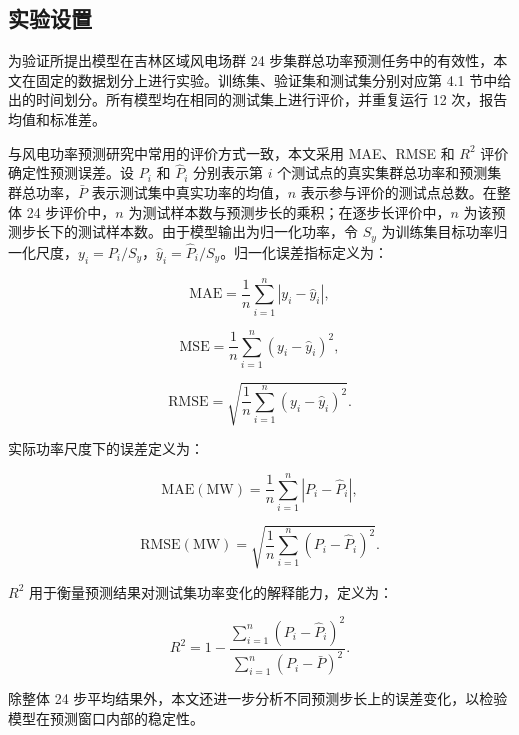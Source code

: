 \subsection{实验设置}

为验证所提出模型在吉林区域风电场群 24 步集群总功率预测任务中的有效性，本文在固定的数据划分上进行实验。训练集、验证集和测试集分别对应第 4.1 节中给出的时间划分。所有模型均在相同的测试集上进行评价，并重复运行 12 次，报告均值和标准差。

与风电功率预测研究中常用的评价方式一致，本文采用 MAE、RMSE 和 \(R^2\) 评价确定性预测误差。设 \(P_i\) 和 \(\hat{P}_i\) 分别表示第 \(i\) 个测试点的真实集群总功率和预测集群总功率，\(\bar{P}\) 表示测试集中真实功率的均值，\(n\) 表示参与评价的测试点总数。在整体 24 步评价中，\(n\) 为测试样本数与预测步长的乘积；在逐步长评价中，\(n\) 为该预测步长下的测试样本数。由于模型输出为归一化功率，令 \(S_y\) 为训练集目标功率归一化尺度，\(y_i=P_i/S_y\)，\(\hat{y}_i=\hat{P}_i/S_y\)。归一化误差指标定义为：

\begin{equation}
\mathrm{MAE}=\frac{1}{n}\sum_{i=1}^{n}|y_i-\hat{y}_i|,
\end{equation}

\begin{equation}
\mathrm{MSE}=\frac{1}{n}\sum_{i=1}^{n}(y_i-\hat{y}_i)^2,
\end{equation}

\begin{equation}
\mathrm{RMSE}=\sqrt{\frac{1}{n}\sum_{i=1}^{n}(y_i-\hat{y}_i)^2}.
\end{equation}

实际功率尺度下的误差定义为：

\begin{equation}
\mathrm{MAE(MW)}=\frac{1}{n}\sum_{i=1}^{n}|P_i-\hat{P}_i|,
\end{equation}

\begin{equation}
\mathrm{RMSE(MW)}=\sqrt{\frac{1}{n}\sum_{i=1}^{n}(P_i-\hat{P}_i)^2}.
\end{equation}

\(R^2\) 用于衡量预测结果对测试集功率变化的解释能力，定义为：

\begin{equation}
R^2=1-\frac{\sum_{i=1}^{n}(P_i-\hat{P}_i)^2}{\sum_{i=1}^{n}(P_i-\bar{P})^2}.
\end{equation}

除整体 24 步平均结果外，本文还进一步分析不同预测步长上的误差变化，以检验模型在预测窗口内部的稳定性。

